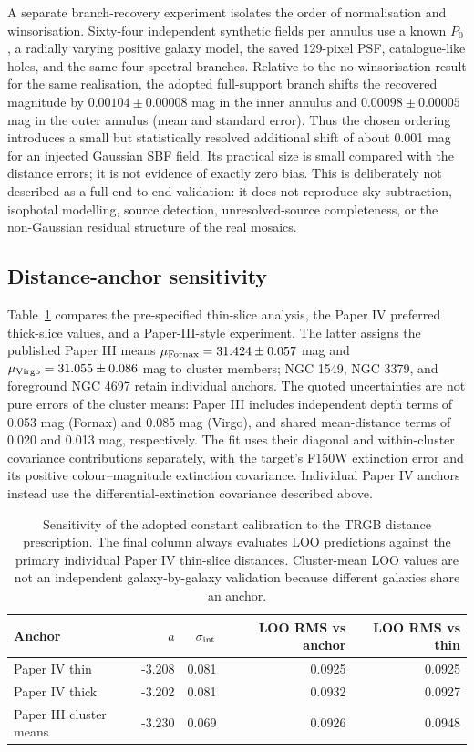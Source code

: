 \documentclass[nodoi,nocopyright]{pas}
\begin{document}
A separate branch-recovery experiment isolates the order of normalisation and
winsorisation.  Sixty-four independent synthetic fields per annulus use a
known $P_0$, a radially varying positive galaxy model, the saved 129-pixel
PSF, catalogue-like holes, and the same four spectral branches.  Relative to
the no-winsorisation result for the same realisation, the adopted
full-support branch shifts the recovered magnitude by
$0.00104\pm0.00008$ mag in the inner annulus and
$0.00098\pm0.00005$ mag in the outer annulus (mean and standard error).
Thus the chosen ordering introduces a small but statistically resolved
additional shift of about 0.001 mag for an injected Gaussian SBF field.
Its practical size is small compared with the distance errors; it is not
evidence of exactly zero bias.  This is deliberately not described as a full
end-to-end validation: it does not reproduce sky subtraction, isophotal
modelling, source detection, unresolved-source completeness, or the
non-Gaussian residual structure of the real mosaics.

\subsection{Distance-anchor sensitivity}

Table~\ref{tab:anchor-sensitivity} compares the pre-specified thin-slice
analysis, the Paper IV preferred thick-slice values, and a Paper-III-style
experiment. The latter assigns the published Paper III means
$\mu_{\rm Fornax}=31.424\pm0.057$ mag and
$\mu_{\rm Virgo}=31.055\pm0.086$ mag to cluster members; NGC 1549,
NGC 3379, and foreground NGC 4697 retain individual anchors.
The quoted uncertainties are not pure errors of the cluster means:
Paper III includes independent depth terms of 0.053 mag (Fornax) and
0.085 mag (Virgo), and shared mean-distance terms of 0.020 and 0.013 mag,
respectively. The fit uses their diagonal and within-cluster covariance
contributions separately, with the target's F150W extinction error and its
positive colour--magnitude extinction covariance. Individual Paper IV
anchors instead use the differential-extinction covariance described above.

\begin{table}[!tbp]
\centering
\caption{Sensitivity of the adopted constant calibration to the TRGB distance
prescription. The final column
always evaluates LOO predictions against the primary individual Paper IV
thin-slice distances. Cluster-mean LOO values are not an independent
galaxy-by-galaxy validation because different galaxies share an anchor.}
\label{tab:anchor-sensitivity}
\begin{tabular}{lrrrr}
\toprule
Anchor & $a$ & $\sigma_{\rm int}$ &
LOO RMS vs anchor & LOO RMS vs thin \\
\midrule
Paper IV thin & -3.208 & 0.081 & 0.0925 & 0.0925 \\
Paper IV thick & -3.202 & 0.081 & 0.0932 & 0.0927 \\
Paper III cluster means & -3.230 & 0.069 & 0.0926 & 0.0948 \\
\bottomrule
\end{tabular}
\end{table}
\end{document}
